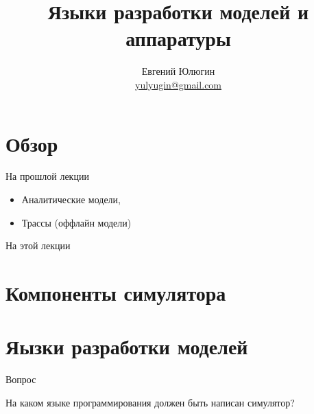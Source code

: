 

\title{Языки разработки моделей и аппаратуры}
\author[Евгений Юлюгин]{Евгений Юлюгин \\ \small{\href{mailto:yulyugin@gmail.com}{yulyugin@gmail.com}}}



\begin{frame}
\titlepage
\end{frame}

\section*{Обзор}

\begin{frame}{На прошлой лекции}

\begin{itemize}
  \item Аналитические модели,
  \item Трассы (оффлайн модели)
\end{itemize}

\end{frame}

\begin{frame}{На этой лекции}
\tableofcontents
\end{frame} 

\section{Компоненты симулятора}

\begin{frame}

\begin{figure}[htp]
    \centering
\end{figure}

\end{frame}

\section{Яызки разработки моделей}

\begin{frame}{Вопрос}

На каком языке программирования должен быть написан симулятор?

\end{frame}

